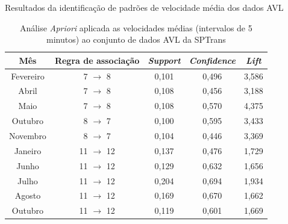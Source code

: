 \documentclass{beamer}
\begin{document}
\begin{frame}{Resultados da identificação de padrões de velocidade média dos dados AVL}
\begin{table}[!htb]
\centering
\caption {Análise \textit{Apriori} aplicada as velocidades médias (intervalos de 5 minutos) ao conjunto de dados AVL da SPTrans}
\label {tab:aprioriFull}
\begin{adjustbox}{max height=10mm, width=4in}
\begin{tabular}{c|c|c|c|c}
\toprule
\textbf{Mês} & \textbf{Regra de associação} & \textit{\textbf{Support}} & \textit{\textbf{Confidence}} & \textit{\textbf{Lift}} \\
\midrule
Fevereiro & 7 $\rightarrow$ 8 & 0,101 & 0,496 & 3,586\\
Abril & 7 $\rightarrow$ 8  & 0,108 & 0,456 & 3,188\\
Maio & 7 $\rightarrow$ 8 & 0,108 & 0,570 & 4,375\\
\midrule
Outubro & 8 $\rightarrow$ 7 & 0,100 & 0,595 & 3,433\\
Novembro & 8 $\rightarrow$ 7 & 0,104 & 0,446 & 3,369\\
\midrule
Janeiro & 11 $\rightarrow$ 12 & 0,137 & 0,476 & 1,729 \\
Junho & 11 $\rightarrow$ 12 & 0,129 & 0,632 & 1,656\\
Julho & 11 $\rightarrow$ 12 & 0,204 & 0,694 & 1,934\\
Agosto & 11 $\rightarrow$ 12 & 0,169 & 0,670 & 1,662\\
Outubro & 11 $\rightarrow$ 12 & 0,119 & 0,601 & 1,669\\
\bottomrule
\end{tabular}
\end{adjustbox}
\end{table}
\end{frame}
\end{document}
